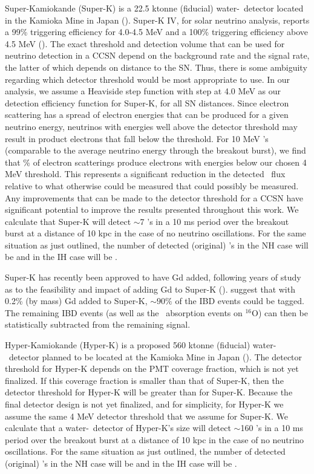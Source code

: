 Super-Kamiokande (Super-K) is a 22.5 ktonne (fiducial) water-\cer\ 
detector located
in the Kamioka Mine in Japan (\citealp{fukudaetal2003,ikedaetal2007}).
Super-K
 IV, for solar
 neutrino analysis, reports a 99\% triggering efficiency for 4.0-4.5 
MeV and a 100\% triggering efficiency above 4.5 MeV
(\citealt{sekiya2013}).  The exact threshold and detection volume that
can be used for neutrino detection in a CCSN depend on the background
rate and the signal rate, the latter of which depends on distance to
the SN.  Thus, there is some ambiguity regarding which detector
threshold would be most appropriate to use.
In our analysis, we assume a Heaviside step function with 
step at 4.0 MeV as our detection efficiency function for Super-K, for
all SN distances.  Since electron scattering
has a spread of electron energies that can be produced for a given
neutrino energy, neutrinos with energies well above the detector
threshold may result in product electrons that fall below the
threshold.  For 10 MeV \nue's (comparable to the average neutrino
energy through the breakout burst), we find that \abt 40\% of electron
scatterings produce electrons with energies below our chosen 4 MeV
threshold.
This represents a significant reduction in the detected \nue\ flux
relative to what otherwise could be measured that could possibly be measured. 
Any improvements that can be made to the detector threshold for
a CCSN have significant potential to 
improve the results presented throughout this work.
  We calculate 
that Super-K  will detect $\sim$7 \nue's in a 10 ms period over the
breakout burst at a distance of 10 kpc in the case of no neutrino
oscillations.  For the same situation as just outlined, the number of
detected (original) \nue's in the NH case will be \abt 0 and in the IH
case will be \abt 1.

Super-K has recently been approved to have Gd added, following
years of study as to the  feasibility and impact of adding Gd to 
Super-K (\citealp{beacomvagins2004,watanabe2009,vagins2012,mori2013}).  
\cite{beacomvagins2004} suggest that with 0.2\% (by mass) 
Gd added to Super-K,
${\sim}90\%$ of the IBD events could be tagged. The remaining
IBD events (as well as the \anue\ absorption events on $^{16}$O) 
can then be statistically subtracted from the remaining
signal.  

Hyper-Kamiokande (Hyper-K) is a proposed 560 ktonne (fiducial) water-\cer\
detector planned to be located at the Kamioka Mine in Japan
(\citealt{abeetal2011}). The detector threshold for Hyper-K depends on
the PMT coverage fraction, which is not yet
finalized.  If this coverage fraction is smaller than that of Super-K,
then the detector threshold for Hyper-K will be greater than for
Super-K.  Because the final detector design is not yet finalized, and
for simplicity, for Hyper-K we assume the same 4 MeV 
detector threshold that
we assume for Super-K.  We calculate 
that a water-\cer\ detector of Hyper-K's size  will detect 
$\sim$160 \nue's in a 10 ms period over the
breakout burst at a distance of 10 kpc in the case of no neutrino
oscillations.  For the same situation as just outlined, the number of
detected (original) \nue's in the NH case will be \abt 30 and in the IH
case will be \abt 70.

